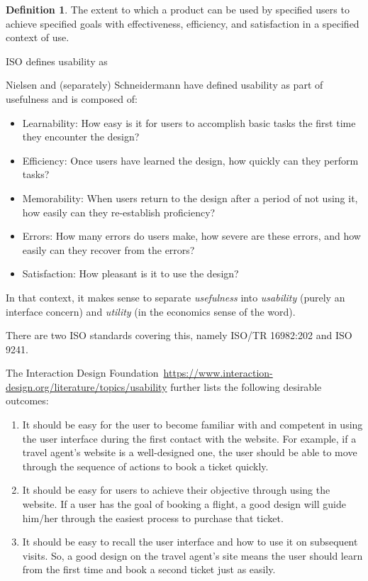 \documentclass[letterpaper,cleveref]{lipics-v2019}
\theoremstyle{definition}
\newtheorem{defn}{Definition}
\begin{document}
\begin{defn}
The extent to which a product can be used by specified users to achieve
specified goals with effectiveness, efficiency, and satisfaction in a specified
context of use.
\end{defn}
ISO defines usability as

Nielsen and (separately) Schneidermann have defined usability as part of usefulness and
is composed of:
\begin{itemize}
\item Learnability: How easy is it for users to accomplish basic tasks the
  first time they encounter the design?
\item Efficiency: Once users have learned the design, how quickly can they perform tasks?
\item Memorability: When users return to the design after a period of not using
  it, how easily can they re-establish proficiency?
\item Errors: How many errors do users make, how severe are these errors, and
  how easily can they recover from the errors?
\item Satisfaction: How pleasant is it to use the design?
\end{itemize}
In that context, it makes sense to separate \emph{usefulness} into
\emph{usability} (purely an interface concern) and \emph{utility} (in the economics
sense of the word).

There are two ISO standards covering this, namely ISO/TR 16982:202 and ISO 9241. 

The Interaction Design Foundation~\url{https://www.interaction-design.org/literature/topics/usability}
further lists the following desirable outcomes:

\begin{enumerate}
\item It should be easy for the user to become familiar with and competent in using
the user interface during the first contact with the website. For example, if a
travel agent’s website is a well-designed one, the user should be able to move
through the sequence of actions to book a ticket quickly.
\item It should be easy for users to achieve their objective through using the
website. If a user has the goal of booking a flight, a good design will guide
him/her through the easiest process to purchase that ticket.
\item It should be easy to recall the user interface and how to use it on
subsequent visits. So, a good design on the travel agent’s site means the user
should learn from the first time and book a second ticket just as easily.
\end{enumerate}
\end{document}
